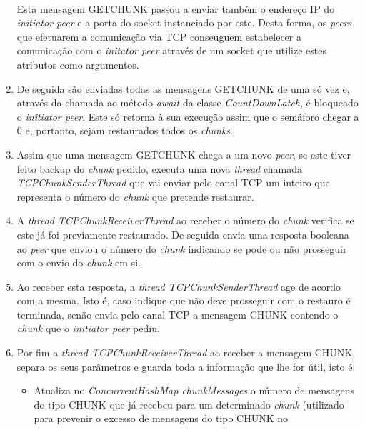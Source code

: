 \documentclass[11pt,oneside]{book}
\begin{document}
\begin{enumerate}
        \paragraph{}
        Esta mensagem GETCHUNK passou a enviar também o endereço IP do \textit{initiator peer} e 
        a porta do socket instanciado por este. Desta forma, os \textit{peers} que efetuarem a 
        comunicação via TCP conseuguem estabelecer a comunicação com o \textit{initator peer}
        através de um socket que utilize estes atributos como argumentos.
        \item De seguida são enviadas todas as mensagens GETCHUNK de uma só vez e,
        através da chamada ao método \textit{await} da classe \textit{CountDownLatch},
        é bloqueado o \textit{initiator peer}. Este só retorna à sua execução assim
        que o semáforo chegar a 0 e, portanto, sejam restaurados todos os 
        \textit{chunks}.
        \item Assim que uma mensagem GETCHUNK chega a um novo \textit{peer}, se
        este tiver feito backup do \textit{chunk} pedido, executa uma nova
        \textit{thread} chamada \textit{TCPChunkSenderThread} que vai enviar pelo 
        canal TCP um inteiro que representa o número do \textit{chunk} que 
        pretende restaurar. 
        \item A \textit{thread TCPChunkReceiverThread} ao receber o número do 
        \textit{chunk} verifica se este já foi previamente restaurado. De seguida
        envia uma resposta booleana ao \textit{peer} que enviou o número do 
        \textit{chunk} indicando se pode ou não prosseguir com o envio do 
        \textit{chunk} em si.
        \item Ao receber esta resposta, a \textit{thread TCPChunkSenderThread} 
        age de acordo com a mesma. Isto é, caso indique que não deve prosseguir
        com o restauro é terminada, senão envia pelo canal TCP a mensagem CHUNK
        contendo o \textit{chunk} que o \textit{initiator peer} pediu.
        \item Por fim a \textit{thread TCPChunkReceiverThread} ao receber a mensagem
        CHUNK, separa os seus parâmetros e guarda toda a informação que lhe for útil,
        isto é:
        \begin{itemize}
            \item Atualiza no \textit{ConcurrentHashMap chunkMessages} o número
            de mensagens do tipo CHUNK que já recebeu para um determinado \textit{chunk}
            (utilizado para prevenir o excesso de mensagens do tipo CHUNK no 

\end{itemize}
\end{enumerate}
\end{document}
